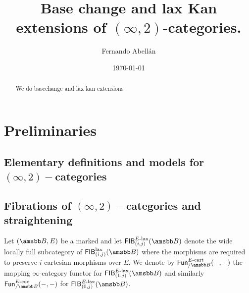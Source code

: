 \documentclass[10pt,a4paper]{amsart}
\title[Base change and lax Kan extensions of $(\infty,2)$-categories]{Base change and lax Kan extensions of $(\infty,2)$-categories.}
\author{Fernando Abell\'an}
\date{\today}
\begin{document}
  \begin{abstract}
    We do basechange and lax kan extensions
  \end{abstract}
  \maketitle 

  \tableofcontents
 

 \section{Preliminaries}
 \subsection{Elementary definitions and models for \texorpdfstring{$(\infty,2)-$}-categories}
 \subsection{Fibrations of \texorpdfstring{$(\infty,2)-$}-categories and straightening}
 \begin{defn}\label{def:elaxfibcat}
  Let $(\tB,E)$ be a marked \itcat{} and let $\FIB_{(i,j)}^{\elax}(\tB)$ denote the wide locally full subcategory of
  $\FIB_{(i,j)}^{\lax}(\tB)$ where the morphisms are required to preserve $i$-cartesian morphisms over $E$. We denote by $\Fun^{E\dcart}_{/\tB}(-,-)$ the mapping $\infty$-category functor for $\FIB_{(1,j)}^{\elax}(\tB)$ and similarly $\Fun^{E\dcoc}_{/\tB}(-,-)$ for $\FIB_{(0,j)}^{\elax}(\tB)$.
\end{defn}
\end{document}
